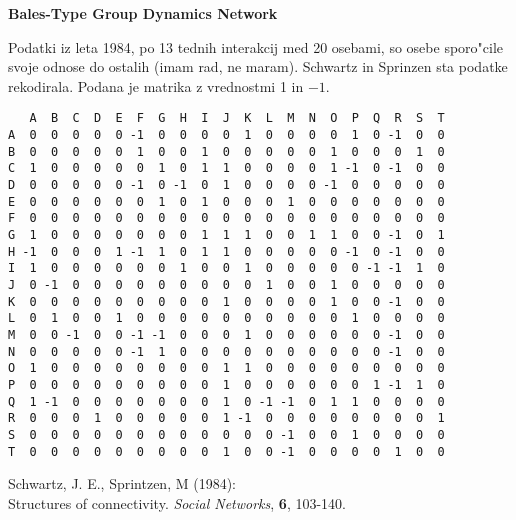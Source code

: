 \documentclass[12pt,a4paper]{article}
\begin{document}
\pagestyle{empty}
{\bf Bales-Type Group Dynamics Network}  

Podatki iz leta 1984, po 13 tednih interakcij med 20 osebami,
so osebe sporo"cile svoje odnose do ostalih (imam rad,
ne maram). Schwartz in Sprinzen sta podatke rekodirala.
Podana je matrika z vrednostmi 1 in $-1$.

\begin{small}
\begin{verbatim}
   A  B  C  D  E  F  G  H  I  J  K  L  M  N  O  P  Q  R  S  T
A  0  0  0  0  0 -1  0  0  0  0  1  0  0  0  0  1  0 -1  0  0
B  0  0  0  0  0  1  0  0  1  0  0  0  0  0  1  0  0  0  1  0
C  1  0  0  0  0  0  1  0  1  1  0  0  0  0  1 -1  0 -1  0  0
D  0  0  0  0  0 -1  0 -1  0  1  0  0  0  0 -1  0  0  0  0  0
E  0  0  0  0  0  0  1  0  1  0  0  0  1  0  0  0  0  0  0  0
F  0  0  0  0  0  0  0  0  0  0  0  0  0  0  0  0  0  0  0  0
G  1  0  0  0  0  0  0  0  1  1  1  0  0  1  1  0  0 -1  0  1
H -1  0  0  0  1 -1  1  0  1  1  0  0  0  0  0 -1  0 -1  0  0
I  1  0  0  0  0  0  0  1  0  0  1  0  0  0  0  0 -1 -1  1  0
J  0 -1  0  0  0  0  0  0  0  0  0  1  0  0  1  0  0  0  0  0
K  0  0  0  0  0  0  0  0  0  1  0  0  0  0  1  0  0 -1  0  0
L  0  1  0  0  1  0  0  0  0  0  0  0  0  0  0  1  0  0  0  0
M  0  0 -1  0  0 -1 -1  0  0  0  1  0  0  0  0  0  0 -1  0  0
N  0  0  0  0  0 -1  1  0  0  0  0  0  0  0  0  0  0 -1  0  0
O  1  0  0  0  0  0  0  0  0  1  1  0  0  0  0  0  0  0  0  0
P  0  0  0  0  0  0  0  0  0  1  0  0  0  0  0  0  1 -1  1  0
Q  1 -1  0  0  0  0  0  0  0  1  0 -1 -1  0  1  1  0  0  0  0
R  0  0  0  1  0  0  0  0  0  1 -1  0  0  0  0  0  0  0  0  1
S  0  0  0  0  0  0  0  0  0  0  0  0 -1  0  0  1  0  0  0  0
T  0  0  0  0  0  0  0  0  0  1  0  0 -1  0  0  0  0  1  0  0
\end{verbatim}
\end{small}

Schwartz, J. E., Sprintzen, M (1984): \\
Structures of connectivity. {\em Social Networks}, {\bf 6}, 103-140.
\end{document}
